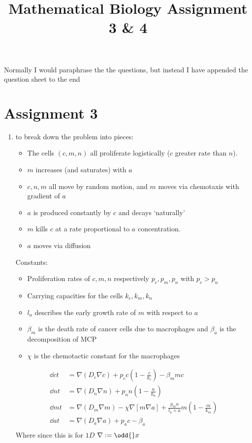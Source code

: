 \documentclass{X:/Documents/Coding/Latex/myassignment}
\title{Mathematical Biology Assignment 3 \& 4}
\begin{document}
\maketitle
Normally I would paraphrase the  the questions, but instead I have appended the question sheet to the end
\section{Assignment 3}
\begin{enumerate}
	\item to break down the problem into pieces:
	\begin{itemize}
		\item The cells $(c,m,n)$ all proliferate logistically ($c$ greater rate than $n$).
		\item $m$ increases (and saturates) with $a$
		\item $c,n,m$ all move by random motion, and $m$ moves via chemotaxis with gradient of $a$
		\item $a$ is produced constantly by $c$ and decays `naturally'
		\item $m$ kills $c$ at a rate proportional to $a$ concentration. 
		\item $a$ moves via diffusion
	\end{itemize}
	Constants:
	\begin{itemize}
		\item Proliferation rates of $c,m,n$ respectively $p_c,p_m,p_n$ with $p_c > p_n$
		\item Carrying capacities for the cells $k_c,k_m,k_n$
		\item $l_a$ describes the early growth rate of $m$ with respect to $a$
		\item $\beta_m$ is the death rate of cancer cells due to macrophages and $\beta_a$ is the decomposition of MCP
		\item $\chi$ is the chemotactic constant for the macrophages
	\end{itemize}
	\begin{align*}
		\dd ct &= \nabla \left(D_c \nabla c\right) + p_c c(1 - \frac{c}{k_c}) - \beta_m m c\\
		\dd nt &= \nabla \left(D_n \nabla n\right) + p_n n(1 - \frac{n}{k_n})\\
		\dd mt &= \nabla \left(D_m \nabla m\right) - \chi \nabla \left[m \nabla a\right] + \frac{p_m a}{l_a+a} m(1 - \frac{m}{k_m})\\
		\dd at &= \nabla \left(D_a \nabla a\right) + p_a c - \beta_a\\
	\end{align*}
	Where since this is for $1D$ $\nabla := \odd{}x$






\end{enumerate}
\end{document}
